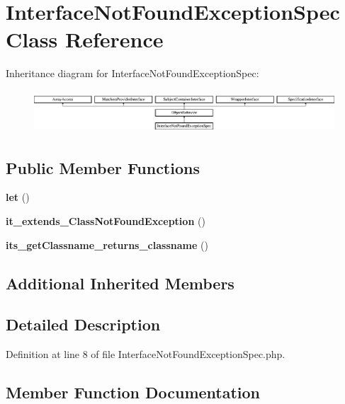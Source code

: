 \section{Interface\+Not\+Found\+Exception\+Spec Class Reference}
\label{classspec_1_1_prophecy_1_1_exception_1_1_doubler_1_1_interface_not_found_exception_spec}
Inheritance diagram for Interface\+Not\+Found\+Exception\+Spec\+:\begin{figure}[H]
\begin{center}
\leavevmode
\includegraphics[height=1.607656cm]{classspec_1_1_prophecy_1_1_exception_1_1_doubler_1_1_interface_not_found_exception_spec}
\end{center}
\end{figure}
\subsection*{Public Member Functions}
\begin{DoxyCompactItemize}
\item 
{\bf let} ()
\item 
{\bf it\+\_\+extends\+\_\+\+Class\+Not\+Found\+Exception} ()
\item 
{\bf its\+\_\+get\+Classname\+\_\+returns\+\_\+classname} ()
\end{DoxyCompactItemize}
\subsection*{Additional Inherited Members}


\subsection{Detailed Description}


Definition at line 8 of file Interface\+Not\+Found\+Exception\+Spec.\+php.



\subsection{Member Function Documentation}
